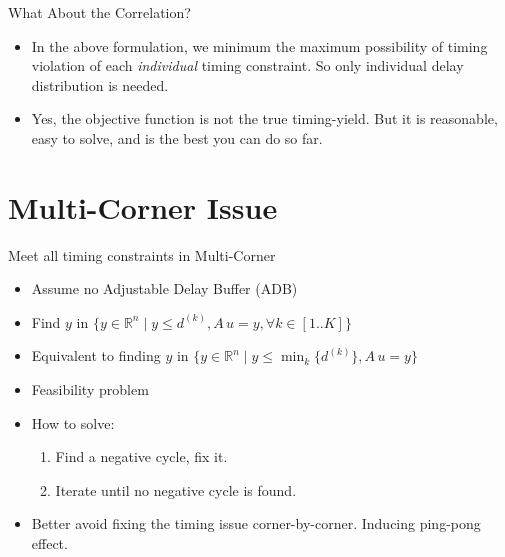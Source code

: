 \documentclass[10pt,ignorenonframetext,mathserif,onlymath]{beamer}
\providecommand{\tightlist}{%
  \setlength{\itemsep}{0pt}\setlength{\parskip}{0pt}}
\begin{document}
\begin{frame}{What About the Correlation?}
\protect\hypertarget{what-about-the-correlation}{}

\begin{itemize}
\tightlist
\item
  In the above formulation, we minimum the maximum possibility of timing
  violation of each \emph{individual} timing constraint. So only
  individual delay distribution is needed.
\item
  Yes, the objective function is not the true timing-yield. But it is
  reasonable, easy to solve, and is the best you can do so far.
\end{itemize}

\end{frame}

\hypertarget{multi-corner-issue}{%
\section{Multi-Corner Issue}\label{multi-corner-issue}}

\begin{frame}{Meet all timing constraints in Multi-Corner}
\protect\hypertarget{meet-all-timing-constraints-in-multi-corner}{}

\begin{itemize}
\tightlist
\item
  Assume no Adjustable Delay Buffer (ADB)
\item
  Find \(y\) in
  \(\{y \in \mathbb{R}^n \mid y \leq d^{(k)}, A\,u = y, \forall k\in[1..K]\}\)
\item
  Equivalent to finding \(y\) in
  \(\{y \in \mathbb{R}^n \mid y \leq \min_k\{ d^{(k)}\}, A\,u = y \}\)
\item
  Feasibility problem
\item
  How to solve:

  \begin{enumerate}
  [1.]
  \tightlist
  \item
    Find a negative cycle, fix it.
  \item
    Iterate until no negative cycle is found.
  \end{enumerate}
\item
  Better avoid fixing the timing issue corner-by-corner. Inducing
  ping-pong effect.
\end{itemize}

\end{frame}
\end{document}
